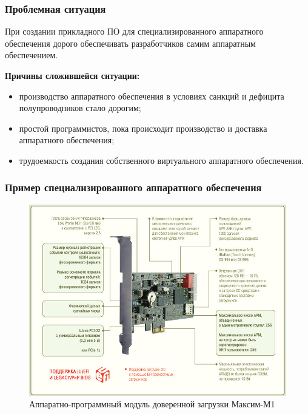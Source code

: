 \begin{frame}%
    \frametitle{Проблемная ситуация}

    При создании прикладного ПО для специализированного аппаратного обеспечения
    дорого обеспечивать разработчиков самим аппаратным обеспечением.

    \textbf{Причины сложившейся ситуации:}
    \begin{itemize}
        \item производство аппаратного обеспечения в условиях санкций и дефицита полупроводников стало дорогим;
        \item простой программистов, пока происходит производство и доставка аппаратного обеспечения;
        \item трудоемкость создания собственного виртуального аппаратного обеспечения.
    \end{itemize}
\end{frame}


\begin{frame}%
    \frametitle{Пример специализированного аппаратного обеспечения}
    \begin{figure}[!htbp]
        \centering
        \begin{adjustbox}{max totalsize={0.8\textwidth}{0.8\textheight}}
            \includegraphics[]{images/apmdz.png}
        \end{adjustbox}
        \caption{Аппаратно-программный модуль доверенной загрузки Максим-М1}
    \end{figure}
\end{frame}


